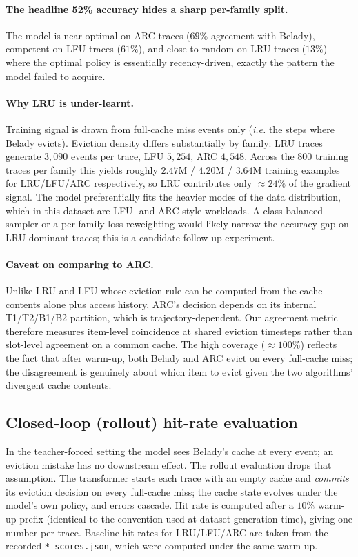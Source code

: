 \documentclass{article}
\begin{document}
\paragraph{The headline 52\% accuracy hides a sharp per-family split.} The
model is near-optimal on ARC traces ($69\%$ agreement with Belady),
competent on LFU traces ($61\%$), and close to random on LRU traces
($13\%$)---where the optimal policy is essentially recency-driven, exactly
the pattern the model failed to acquire.

\paragraph{Why LRU is under-learnt.} Training signal is drawn from
full-cache miss events only (\emph{i.e.} the steps where Belady evicts).
Eviction density differs substantially by family:
LRU traces generate $3{,}090$ events per trace, LFU $5{,}254$, ARC $4{,}548$.
Across the 800 training traces per family this yields roughly
$2.47$M / $4.20$M / $3.64$M training examples for LRU/LFU/ARC respectively,
so LRU contributes only $\approx\!24\%$ of the gradient signal. The model
preferentially fits the heavier modes of the data distribution, which in
this dataset are LFU- and ARC-style workloads. A class-balanced sampler or
a per-family loss reweighting would likely narrow the accuracy gap on
LRU-dominant traces; this is a candidate follow-up experiment.

\paragraph{Caveat on comparing to ARC.} Unlike LRU and LFU whose eviction
rule can be computed from the cache contents alone plus access history,
ARC's decision depends on its internal T1/T2/B1/B2 partition, which is
trajectory-dependent. Our agreement metric therefore measures item-level
coincidence at shared eviction timesteps rather than slot-level agreement on
a common cache. The high coverage ($\approx\!100\%$) reflects the fact that
after warm-up, both Belady and ARC evict on every full-cache miss; the
disagreement is genuinely about which item to evict given the two
algorithms' divergent cache contents.

\subsection{Closed-loop (rollout) hit-rate evaluation}

In the teacher-forced setting the model sees Belady's cache at every event;
an eviction mistake has no downstream effect. The rollout evaluation drops
that assumption. The transformer starts each trace with an empty cache and
\emph{commits} its eviction decision on every full-cache miss; the cache
state evolves under the model's own policy, and errors cascade. Hit rate is
computed after a $10\%$ warm-up prefix (identical to the convention used at
dataset-generation time), giving one number per trace. Baseline hit rates for
LRU/LFU/ARC are taken from the recorded \texttt{*\_scores.json}, which were
computed under the same warm-up.
\end{document}
